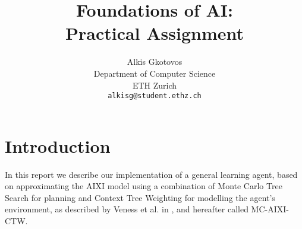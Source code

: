 \documentclass{article} %
\title{Foundations of AI:\\Practical Assignment}
\author{
Alkis Gkotovos\\
Department of Computer Science\\
ETH Zurich\\
\texttt{alkisg@student.ethz.ch}
}
\begin{document}
\maketitle


\section{Introduction}
In this report we describe our implementation of a general learning agent,
based on approximating the AIXI model using a combination of Monte Carlo
Tree Search for planning and Context Tree Weighting for modelling the
agent's environment, as described by Veness et al. in \cite{mc_aixi_ctw},
and hereafter called MC-AIXI-CTW.



\end{document}
